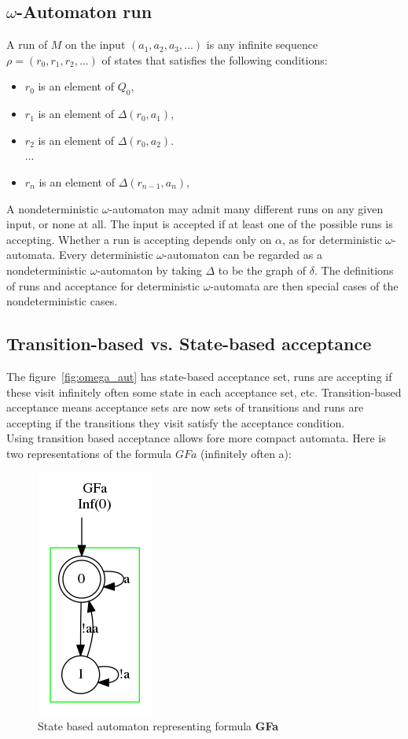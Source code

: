 \subsection{$\omega$-Automaton run}
A run of $M$ on the input $(a_1, a_2, a_3,...)$ is any infinite sequence
$\rho = (r_0, r_1, r_2,...)$ of states that satisfies the following conditions:
\begin{itemize}
 \item $r_0$ is an element of $Q_0$,
 \item $r_1$ is an element of $\Delta(r_0, a_1)$,
 \item $r_2$ is an element of $\Delta(r_0, a_2)$.\\...
 \item $r_n$ is an element of $\Delta(r_{n-1}, a_n)$,
\end{itemize}

A nondeterministic $\omega$-automaton may admit many different runs on any given input, or none at all.
The input is accepted if at least one of the possible runs is accepting. Whether a run is accepting depends
only on $\alpha$, as for deterministic $\omega$-automata. Every deterministic $\omega$-automaton can be
regarded as a nondeterministic $\omega$-automaton by taking $\Delta$ to be the graph of $\delta$.
The definitions of runs and acceptance for deterministic $\omega$-automata are then special cases of the
nondeterministic cases.

\subsection{Transition-based vs. State-based acceptance}
The figure~\ref{fig:omega_aut} has state-based acceptance set, runs are accepting if these visit infinitely
often some state in each acceptance set, etc. Transition-based acceptance means acceptance sets are now
sets of transitions and runs are accepting if the transitions they visit satisfy the acceptance condition.\\

Using transition based acceptance allows fore more compact automata. Here is two representations of the
formula $GFa$ (infinitely often a):

\begin{figure}[H]
 \centering
 \includegraphics[scale=0.8]{img/state_based.png}
 \caption{State based automaton representing formula \textbf{GFa}}
 \label{fig:state_based}
\end{figure}

